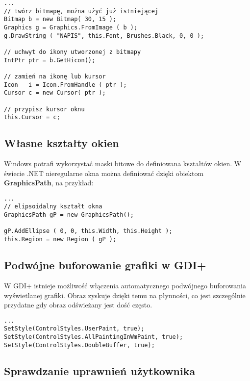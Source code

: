 \begin{scriptsize}
\begin{verbatim}
...
// twórz bitmapę, można użyć już istniejącej
Bitmap b = new Bitmap( 30, 15 );
Graphics g = Graphics.FromImage ( b );
g.DrawString ( "NAPIS", this.Font, Brushes.Black, 0, 0 );

// uchwyt do ikony utworzonej z bitmapy
IntPtr ptr = b.GetHicon();

// zamień na ikonę lub kursor
Icon   i = Icon.FromHandle ( ptr );
Cursor c = new Cursor( ptr );

// przypisz kursor oknu
this.Cursor = c;
\end{verbatim}
\end{scriptsize}

\subsection{Własne kształty okien}

Windows potrafi wykorzystać maski bitowe do definiowana kształtów okien. W świecie .NET nieregularne
okna można definiować dzięki obiektom {\bf GraphicsPath}, na przykład:

\begin{scriptsize}
\begin{verbatim}
...
// elipsoidalny kształt okna
GraphicsPath gP = new GraphicsPath();

gP.AddEllipse ( 0, 0, this.Width, this.Height );
this.Region = new Region ( gP );
\end{verbatim}
\end{scriptsize}

\subsection{Podwójne buforowanie grafiki w GDI+}

W GDI+ istnieje możliwość włączenia automatycznego podwójnego buforowania wyświetlanej grafiki.
Obraz zyskuje dzięki temu na płynności, co jest szczególnie przydatne gdy obraz odświeżany jest
dość często.

\begin{scriptsize}
\begin{verbatim}
...
SetStyle(ControlStyles.UserPaint, true);
SetStyle(ControlStyles.AllPaintingInWmPaint, true);
SetStyle(ControlStyles.DoubleBuffer, true);
\end{verbatim}
\end{scriptsize}

\subsection{Sprawdzanie uprawnień użytkownika}

